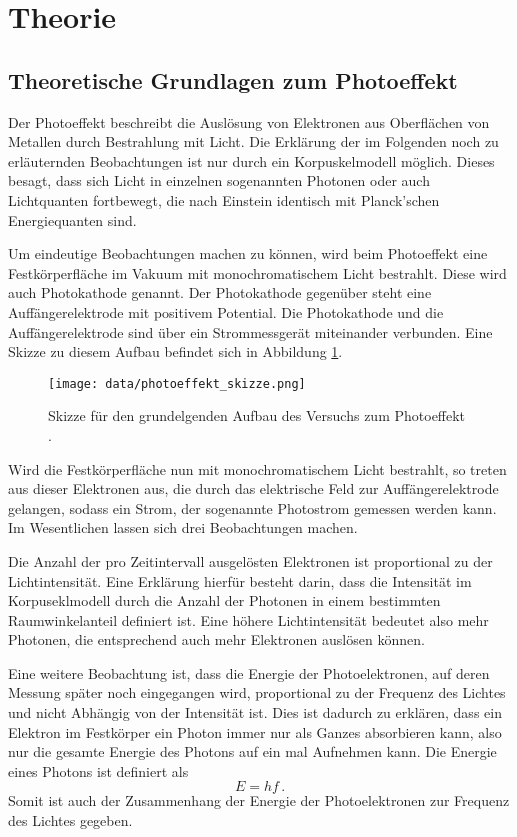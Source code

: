 \section{Theorie}
\label{sec:Theorie}

\subsection{Theoretische Grundlagen zum Photoeffekt}
\label{subsec:Theorie_Photoeffekt}

Der Photoeffekt beschreibt die Auslösung von Elektronen aus Oberflächen von Metallen
durch Bestrahlung mit Licht. Die Erklärung der im Folgenden noch zu erläuternden
Beobachtungen ist nur durch ein Korpuskelmodell möglich. Dieses besagt, dass sich
Licht in einzelnen sogenannten Photonen oder auch Lichtquanten fortbewegt, die nach
Einstein identisch mit Planck'schen Energiequanten sind.

Um eindeutige Beobachtungen machen zu können, wird beim Photoeffekt eine Festkörperfläche
im Vakuum mit monochromatischem Licht bestrahlt. Diese wird auch Photokathode genannt.
Der Photokathode gegenüber steht eine Auffängerelektrode mit positivem Potential.
Die Photokathode und die Auffängerelektrode sind über ein Strommessgerät miteinander verbunden.
Eine Skizze zu diesem Aufbau befindet sich in Abbildung \ref{fig:photoeffekt_skizze}.

\begin{figure}
  \centering
  \texttt{[image: data/photoeffekt\_skizze.png]}
  \caption{Skizze für den grundelgenden Aufbau des Versuchs zum Photoeffekt \cite{Versuchsanleitung}.}
  \label{fig:photoeffekt_skizze}
\end{figure}

Wird die Festkörperfläche nun mit monochromatischem Licht bestrahlt, so treten aus dieser
Elektronen aus, die durch das elektrische Feld zur Auffängerelektrode gelangen, sodass
ein Strom, der sogenannte Photostrom gemessen werden kann. Im Wesentlichen lassen
sich drei Beobachtungen machen.

Die Anzahl der pro Zeitintervall ausgelösten Elektronen ist proportional zu der
Lichtintensität. Eine Erklärung hierfür besteht darin, dass die Intensität im Korpuseklmodell
durch die Anzahl der Photonen in einem bestimmten Raumwinkelanteil definiert ist.
Eine höhere Lichtintensität bedeutet also mehr Photonen, die entsprechend auch mehr
Elektronen auslösen können.

Eine weitere Beobachtung ist, dass die Energie der Photoelektronen, auf deren Messung später noch
eingegangen wird, proportional zu der Frequenz des Lichtes und nicht Abhängig von der
Intensität ist. Dies ist dadurch zu erklären, dass ein Elektron im Festkörper ein Photon
immer nur als Ganzes absorbieren kann, also nur die gesamte Energie des Photons auf ein mal
Aufnehmen kann. Die Energie eines Photons ist definiert als
\begin{equation}
  E=h f \,.
\end{equation}
Somit ist auch der Zusammenhang der Energie der Photoelektronen zur Frequenz des Lichtes gegeben.

